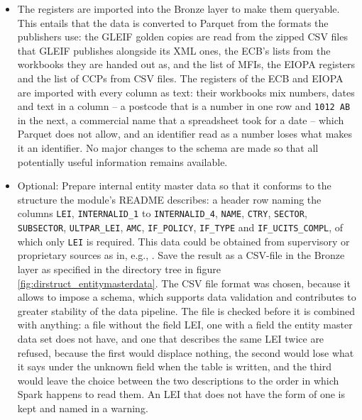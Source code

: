 \begin{itemize}
A download leaves the register or nothing. The answer is written under a temporary name and put in place only once it is complete, so an interrupted download leaves nothing behind under the name the Bronze import reads. An error answer, and an answer that is served with a success status but does not open as the archive it should be, are refused for the same reason: a GLEIF link that has gone stale answers with an error page, which would otherwise be stored under the name of the register and imported as if it were one.
	\item The registers are imported into the Bronze layer to make them queryable. This entails that the data is converted to Parquet from the formats the publishers use: the GLEIF golden copies are read from the zipped CSV files that GLEIF publishes alongside its XML ones, the ECB's lists from the workbooks they are handed out as, and the list of MFIs, the EIOPA registers and the list of CCPs from CSV files. The registers of the ECB and EIOPA are imported with every column as text: their workbooks mix numbers, dates and text in a column -- a postcode that is a number in one row and \verb|1012 AB| in the next, a commercial name that a spreadsheet took for a date -- which Parquet does not allow, and an identifier read as a number loses what makes it an identifier. No major changes to the schema are made so that all potentially useful information remains available.
	\item Optional: Prepare internal entity master data so that it conforms to the structure the module's README describes: a header row naming the columns \verb|LEI|, \verb|INTERNALID_1| to \verb|INTERNALID_4|, \verb|NAME|, \verb|CTRY|, \verb|SECTOR|, \verb|SUBSECTOR|, \verb|ULTPAR_LEI|, \verb|AMC|, \verb|IF_POLICY|, \verb|IF_TYPE| and \verb|IF_UCITS_COMPL|, of which only \verb|LEI| is required. This data could be obtained from supervisory or proprietary sources as in, e.g., \textcite{Lenoci.2021}. Save the result as a CSV-file in the Bronze layer as specified in the directory tree in figure \ref{fig:dirstruct_entitymasterdata}. The CSV file format was chosen, because it allows to impose a schema, which supports data validation and contributes to greater stability of the data pipeline. The file is checked before it is combined with anything: a file without the field LEI, one with a field the entity master data set does not have, and one that describes the same LEI twice are refused, because the first would displace nothing, the second would lose what it says under the unknown field when the table is written, and the third would leave the choice between the two descriptions to the order in which Spark happens to read them. An LEI that does not have the form of one is kept and named in a warning.

\end{itemize}

